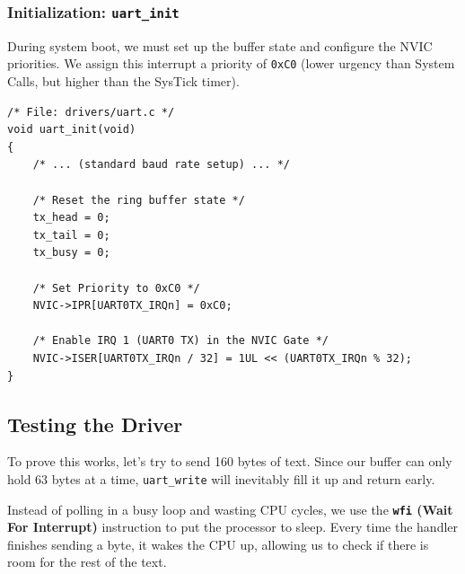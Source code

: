 \subsubsection{Initialization: \texttt{uart\_init}}
During system boot, we must set up the buffer state and configure the NVIC priorities. We assign this interrupt a priority of \texttt{0xC0} (lower urgency than System Calls, but higher than the SysTick timer).

\begin{lstlisting}
/* File: drivers/uart.c */
void uart_init(void)
{
    /* ... (standard baud rate setup) ... */

    /* Reset the ring buffer state */
    tx_head = 0; 
    tx_tail = 0; 
    tx_busy = 0;

    /* Set Priority to 0xC0 */
    NVIC->IPR[UART0TX_IRQn] = 0xC0;
    
    /* Enable IRQ 1 (UART0 TX) in the NVIC Gate */
    NVIC->ISER[UART0TX_IRQn / 32] = 1UL << (UART0TX_IRQn % 32);
}
\end{lstlisting}

\subsection{Testing the Driver}
To prove this works, let's try to send 160 bytes of text. Since our buffer can only hold 63 bytes at a time, \texttt{uart\_write} will inevitably fill it up and return early. 

Instead of polling in a busy loop and wasting CPU cycles, we use the \textbf{\texttt{wfi} (Wait For Interrupt)} instruction to put the processor to sleep. Every time the handler finishes sending a byte, it wakes the CPU up, allowing us to check if there is room for the rest of the text.

